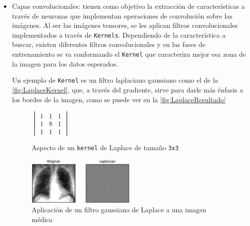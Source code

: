 \begin{itemize}
    \item Capas convolucionales: tienen como objetivo la extracción de características a través de neuronas que implementan operaciones de convolución sobre las imágenes. 
    Al ser las imágenes tensores, se les aplican filtros convolucionales implementados a través de \texttt{Kernels}. 
    Dependiendo de la característica a buscar, existen diferentes filtros convolucionales y en las fases de entrenamiento se va conformando el \texttt{Kernel} que caracteriza mejor esa zona de la imagen para los datos esperados.

    Un ejemplo de \texttt{Kernel} es un filtro laplaciano gaussiano como el de la \autoref{fig:LaplaceKernel}, que, a través del gradiente, sirve para darle más énfasis a los bordes de la imagen, como se puede ver 
    en la \autoref{fig:LaplaceResultado}
    \begin{figure}[H]
        \centering
        \(
        \begin{vmatrix}
            1 & 1 & 1 \\
            1 & 8 & 1 \\
            1 & 1 & 1
        \end{vmatrix}
        \)
        \caption{Aspecto de un \texttt{kernel} de Laplace de tamaño \texttt{3x3}}
        \label{fig:LaplaceKernel}
    \end{figure}
    \begin{figure}[H]
        \centering
        \includegraphics[width=0.5\textwidth]{images/4/KernelsTipicos.jpg}
        \caption{Aplicación de un filtro gaussiano de Laplace a una imagen médica\cite{LaplacianFilterOverview}}
        \label{fig:LaplaceResultado}
    \end{figure}


\end{itemize}
